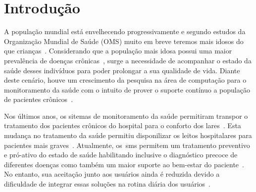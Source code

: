 \chapter{Introdu\c{c}\~{a}o} \label{chapter:intro}
A população mundial está envelhecendo progressivamente e segundo estudos da Organização Mundial de Saúde (OMS) muito em breve teremos mais idosos do que crianças~\cite{ageing2011}. Considerando que a população mais idosa possui uma maior prevalência de doenças crônicas~\cite{prevcronica2009}, surge a necessidade de 
acompanhar o estado da saúde desses indivíduos para poder prolongar a sua qualidade de vida. Diante deste cenário, houve um crescimento da pesquisa na área de computação para o monitoramento da saúde com o intuito de prover o suporte contínuo a população de pacientes crônicos~\cite{healthmonitoring2013,berg03,bardram2010,Ballegaard:2008:HEL:1357054.1357336,aarhus_negotiating_2010}. 

Nos últimos anos, os sitemas de monitoramento da saúde permitiram transpor o tratamento dos pacientes crônicos do hospital para o conforto dos lares~\cite{homecarebrazil2011}. Esta mudança no tratamento da saúde permitiu disponilizar os leitos hospitalares para pacientes mais graves~\cite{Storni:2014:DCU:2628458.2628474}. Atualmente, os~\ac{sms} permitem um tratamento preventivo e pró-ativo do estado de saúde habilitando inclusive o diagnóstico precoce de diferentes doenças como também um maior suporte ao bem-estar do paciente~\cite{sacsvmhms2014}. No entanto, sua aceitação junto aos usuários ainda é reduzida devido a dificuldade de integrar essas soluções na rotina diária dos usuários~\cite{aarhus_negotiating_2010}. 








